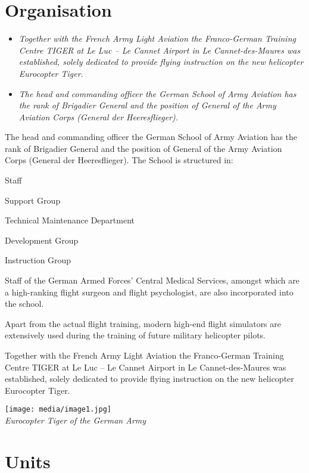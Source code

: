 \section{Organisation}\label{organisation}

\begin{itemize}
\item
  \emph{Together with the French Army Light Aviation the Franco-German
  Training Centre TIGER at Le Luc -- Le Cannet Airport in Le
  Cannet-des-Maures was established, solely dedicated to provide flying
  instruction on the new helicopter Eurocopter Tiger.}
\item
  \emph{The head and commanding officer the German School of Army
  Aviation has the rank of Brigadier General and the position of General
  of the Army Aviation Corps (General der Heeresflieger).}
\end{itemize}

The head and commanding officer the German School of Army Aviation has
the rank of Brigadier General and the position of General of the Army
Aviation Corps (General der Heeresflieger). The School is structured in:

Staff

Support Group

Technical Maintenance Department

Development Group

Instruction Group

Staff of the German Armed Forces' Central Medical Services, amongst
which are a high-ranking flight surgeon and flight psychologist, are
also incorporated into the school.

Apart from the actual flight training, modern high-end flight simulators
are extensively used during the training of future military helicopter
pilots.

Together with the French Army Light Aviation the Franco-German Training
Centre TIGER at Le Luc -- Le Cannet Airport in Le Cannet-des-Maures was
established, solely dedicated to provide flying instruction on the new
helicopter Eurocopter Tiger.

\texttt{[image: media/image1.jpg]}\\
\emph{Eurocopter Tiger of the German Army}

\section{Units}\label{units}

